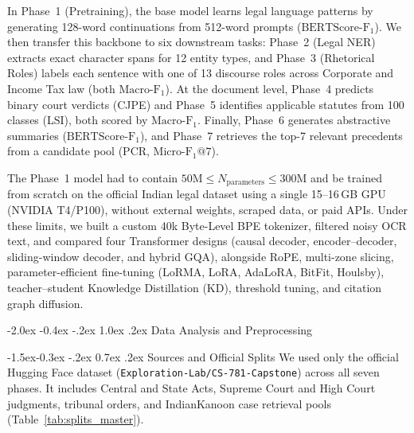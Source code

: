 \documentclass[11pt, oneside]{article}
\makeatletter
\renewcommand\section{\@startsection {section}{1}{\z@}%
  {-2.0ex \@plus -0.4ex \@minus -.2ex}%
  {1.0ex \@plus.2ex}%
  {\normalfont\Large\bfseries}}
\renewcommand\subsection{\@startsection{subsection}{2}{\z@}%
  {-1.5ex\@plus -0.3ex \@minus -.2ex}%
  {0.7ex \@plus .2ex}%
  {\normalfont\large\bfseries}}
\makeatother
\begin{document}
In Phase~1 (Pretraining), the base model learns legal language patterns by generating 128-word continuations from 512-word prompts ($\text{BERTScore-F}_1$). We then transfer this backbone to six downstream tasks: Phase~2 (Legal NER) extracts exact character spans for 12 entity types, and Phase~3 (Rhetorical Roles) labels each sentence with one of 13 discourse roles across Corporate and Income Tax law (both $\text{Macro-F}_1$). At the document level, Phase~4 predicts binary court verdicts (CJPE) and Phase~5 identifies applicable statutes from 100 classes (LSI), both scored by $\text{Macro-F}_1$. Finally, Phase~6 generates abstractive summaries ($\text{BERTScore-F}_1$), and Phase~7 retrieves the top-7 relevant precedents from a candidate pool (PCR, $\text{Micro-F}_1@7$).

The Phase~1 model had to contain $50\text{M}\leq N_{\mathrm{parameters}}\leq300\text{M}$ and be trained from scratch on the official Indian legal dataset using a single 15--16\,GB GPU (NVIDIA T4/P100), without external weights, scraped data, or paid APIs. Under these limits, we built a custom 40k Byte-Level BPE tokenizer, filtered noisy OCR text, and compared four Transformer designs (causal decoder, encoder--decoder, sliding-window decoder, and hybrid GQA), alongside RoPE, multi-zone slicing, parameter-efficient fine-tuning (LoRMA, LoRA, AdaLoRA, BitFit, Houlsby), teacher--student Knowledge Distillation (KD), threshold tuning, and citation graph diffusion.

\section{Data Analysis and Preprocessing}

\subsection{Sources and Official Splits}
We used only the official Hugging Face dataset (\texttt{Exploration-Lab/CS-781-Capstone}) across all seven phases. It includes Central and State Acts, Supreme Court and High Court judgments, tribunal orders, and IndianKanoon case retrieval pools (Table~\ref{tab:splits_master}).
\end{document}
